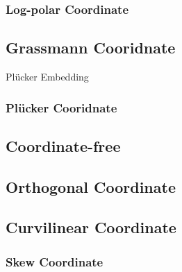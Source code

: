 \subsubsection{Log-polar Coordinate}\label{sec:logpolar_coordinate}



\subsection{Grassmann Cooridnate}\label{sec:grassmann_coordinate}

Pl\"ucker Embedding



\subsubsection{Pl\"ucker Cooridnate}\label{sec:plucker_coordinate}



\subsection{Coordinate-free}\label{sec:coordinate_free}

\subsection{Orthogonal Coordinate}\label{sec:orthogonal_coordinate}

\subsection{Curvilinear Coordinate}\label{sec:curvilinear_coordinate}

\subsubsection{Skew Coordinate}\label{sec:skew_coordinate}



